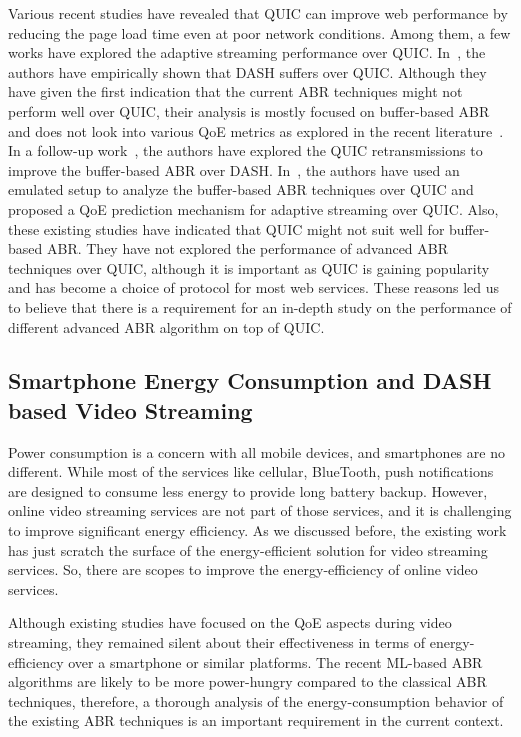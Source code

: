 Various recent studies \cite{Biswal2016,Megyesi2016,bhat2017not} have revealed that \ac{QUIC} can improve web performance by reducing the page load time even at poor network conditions. Among them, a few works have explored the adaptive streaming performance over \ac{QUIC}. In~\cite{bhat2017not}, the authors have empirically shown that \ac{DASH} suffers over \ac{QUIC}. Although they have given the first indication that the current \ac{ABR} techniques might not perform well over \ac{QUIC}, their analysis is mostly focused on buffer-based ABR and does not look into various QoE metrics as explored in the recent literature~\cite{yin2015control,mao2017neural}. In a follow-up work~\cite{bhat2018improving}, the authors have explored the \ac{QUIC} retransmissions to improve the buffer-based \ac{ABR} over \ac{DASH}. In~\cite{van2018empirical}, the authors have used an emulated setup to analyze the buffer-based \ac{ABR} techniques over \ac{QUIC} and proposed a \ac{QoE} prediction mechanism for adaptive streaming over \ac{QUIC}. Also, these existing studies have indicated that \ac{QUIC} might not suit well for buffer-based \ac{ABR}. They have not explored the performance of advanced \ac{ABR} techniques over \ac{QUIC}, although it is important as \ac{QUIC} is gaining popularity and has become a choice of protocol for most web services. These reasons led us to believe that there is a requirement for an in-depth study on the performance of different advanced \ac{ABR} algorithm on top of \ac{QUIC}.

\subsection{Smartphone Energy Consumption and DASH based Video Streaming}
Power consumption is a concern with all mobile devices, and smartphones are no different. While most of the services like cellular, BlueTooth, push notifications are designed to consume less energy to provide long battery backup. However, online video streaming services are not part of those services, and it is challenging to improve significant energy efficiency. As we discussed before, the existing work has just scratch the surface of the energy-efficient solution for video streaming services. So, there are scopes to improve the energy-efficiency of online video services.

Although existing studies have focused on the \ac{QoE} aspects during video streaming, they remained silent about their effectiveness in terms of energy-efficiency over a smartphone or similar platforms. The recent \ac{ML}-based \ac{ABR} algorithms are likely to be more power-hungry compared to the classical \ac{ABR} techniques, therefore, a thorough analysis of the energy-consumption behavior of the existing \ac{ABR} techniques is an important requirement in the current context.

